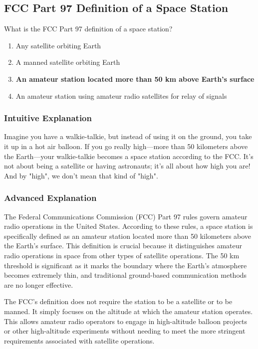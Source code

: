 \subsection{FCC Part 97 Definition of a Space Station}
\label{T1A07}

\begin{tcolorbox}[colback=gray!10!white,colframe=black!75!black,title=T1A07]
What is the FCC Part 97 definition of a space station?
\begin{enumerate}[label=\Alph*)]
    \item Any satellite orbiting Earth
    \item A manned satellite orbiting Earth
    \item \textbf{An amateur station located more than 50 km above Earth's surface}
    \item An amateur station using amateur radio satellites for relay of signals
\end{enumerate}
\end{tcolorbox}

\subsubsection{Intuitive Explanation}
Imagine you have a walkie-talkie, but instead of using it on the ground, you take it up in a hot air balloon. If you go really high—more than 50 kilometers above the Earth—your walkie-talkie becomes a space station according to the FCC. It’s not about being a satellite or having astronauts; it’s all about how high you are! And by "high", we don't mean that kind of "high".

\subsubsection{Advanced Explanation}
The Federal Communications Commission (FCC) Part 97 rules govern amateur radio operations in the United States. According to these rules, a space station is specifically defined as an amateur station located more than 50 kilometers above the Earth's surface. This definition is crucial because it distinguishes amateur radio operations in space from other types of satellite operations. The 50 km threshold is significant as it marks the boundary where the Earth's atmosphere becomes extremely thin, and traditional ground-based communication methods are no longer effective. 

The FCC's definition does not require the station to be a satellite or to be manned. It simply focuses on the altitude at which the amateur station operates. This allows amateur radio operators to engage in high-altitude balloon projects or other high-altitude experiments without needing to meet the more stringent requirements associated with satellite operations.


